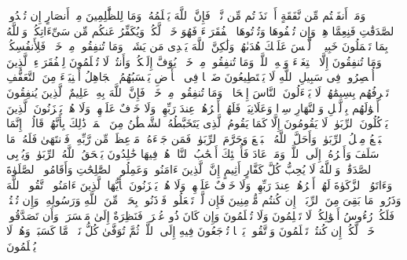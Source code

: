 \stopbuffer%
\startbuffer[\q:2:270]
وَمَاۤ أَنفَقۡتُم مِّن نَّفَقَةٍ أَوۡ نَذَرۡتُم مِّن نَّذۡرࣲ فَإِنَّ ٱللَّهَ یَعۡلَمُهُۥۗ وَمَا لِلظَّٰلِمِینَ مِنۡ أَنصَارٍ%
\stopbuffer%
\startbuffer[\q:2:271]
إِن تُبۡدُوا۟ ٱلصَّدَقَٰتِ فَنِعِمَّا هِیَۖ وَإِن تُخۡفُوهَا وَتُؤۡتُوهَا ٱلۡفُقَرَاۤءَ فَهُوَ خَیۡرࣱ لَّكُمۡۚ وَیُكَفِّرُ عَنكُم مِّن سَیِّءَاتِكُمۡۗ وَٱللَّهُ بِمَا تَعۡمَلُونَ خَبِیرࣱ%
\stopbuffer%
\startbuffer[\q:2:272]
۞ لَّیۡسَ عَلَیۡكَ هُدَىٰهُمۡ وَلَٰكِنَّ ٱللَّهَ یَهۡدِی مَن یَشَاۤءُۗ وَمَا تُنفِقُوا۟ مِنۡ خَیۡرࣲ فَلِأَنفُسِكُمۡۚ وَمَا تُنفِقُونَ إِلَّا ٱبۡتِغَاۤءَ وَجۡهِ ٱللَّهِۚ وَمَا تُنفِقُوا۟ مِنۡ خَیۡرࣲ یُوَفَّ إِلَیۡكُمۡ وَأَنتُمۡ لَا تُظۡلَمُونَ%
\stopbuffer%
\startbuffer[\q:2:273]
لِلۡفُقَرَاۤءِ ٱلَّذِینَ أُحۡصِرُوا۟ فِی سَبِیلِ ٱللَّهِ لَا یَسۡتَطِیعُونَ ضَرۡبࣰا فِی ٱلۡأَرۡضِ یَحۡسَبُهُمُ ٱلۡجَاهِلُ أَغۡنِیَاۤءَ مِنَ ٱلتَّعَفُّفِ تَعۡرِفُهُم بِسِیمَٰهُمۡ لَا یَسۡءَلُونَ ٱلنَّاسَ إِلۡحَافࣰاۗ وَمَا تُنفِقُوا۟ مِنۡ خَیۡرࣲ فَإِنَّ ٱللَّهَ بِهِۦ عَلِیمٌ%
\stopbuffer%
\startbuffer[\q:2:274]
ٱلَّذِینَ یُنفِقُونَ أَمۡوَٰلَهُم بِٱلَّیۡلِ وَٱلنَّهَارِ سِرࣰّا وَعَلَانِیَةࣰ فَلَهُمۡ أَجۡرُهُمۡ عِندَ رَبِّهِمۡ وَلَا خَوۡفٌ عَلَیۡهِمۡ وَلَا هُمۡ یَحۡزَنُونَ%
\stopbuffer%
\startbuffer[\q:2:275]
ٱلَّذِینَ یَأۡكُلُونَ ٱلرِّبَوٰا۟ لَا یَقُومُونَ إِلَّا كَمَا یَقُومُ ٱلَّذِی یَتَخَبَّطُهُ ٱلشَّیۡطَٰنُ مِنَ ٱلۡمَسِّۚ ذَٰلِكَ بِأَنَّهُمۡ قَالُوۤا۟ إِنَّمَا ٱلۡبَیۡعُ مِثۡلُ ٱلرِّبَوٰا۟ۗ وَأَحَلَّ ٱللَّهُ ٱلۡبَیۡعَ وَحَرَّمَ ٱلرِّبَوٰا۟ۚ فَمَن جَاۤءَهُۥ مَوۡعِظَةࣱ مِّن رَّبِّهِۦ فَٱنتَهَىٰ فَلَهُۥ مَا سَلَفَ وَأَمۡرُهُۥۤ إِلَى ٱللَّهِۖ وَمَنۡ عَادَ فَأُو۟لَٰۤئِكَ أَصۡحَٰبُ ٱلنَّارِۖ هُمۡ فِیهَا خَٰلِدُونَ%
\stopbuffer%
\startbuffer[\q:2:276]
یَمۡحَقُ ٱللَّهُ ٱلرِّبَوٰا۟ وَیُرۡبِی ٱلصَّدَقَٰتِۗ وَٱللَّهُ لَا یُحِبُّ كُلَّ كَفَّارٍ أَثِیمٍ%
\stopbuffer%
\startbuffer[\q:2:277]
إِنَّ ٱلَّذِینَ ءَامَنُوا۟ وَعَمِلُوا۟ ٱلصَّٰلِحَٰتِ وَأَقَامُوا۟ ٱلصَّلَوٰةَ وَءَاتَوُا۟ ٱلزَّكَوٰةَ لَهُمۡ أَجۡرُهُمۡ عِندَ رَبِّهِمۡ وَلَا خَوۡفٌ عَلَیۡهِمۡ وَلَا هُمۡ یَحۡزَنُونَ%
\stopbuffer%
\startbuffer[\q:2:278]
یَٰۤأَیُّهَا ٱلَّذِینَ ءَامَنُوا۟ ٱتَّقُوا۟ ٱللَّهَ وَذَرُوا۟ مَا بَقِیَ مِنَ ٱلرِّبَوٰۤا۟ إِن كُنتُم مُّؤۡمِنِینَ%
\stopbuffer%
\startbuffer[\q:2:279]
فَإِن لَّمۡ تَفۡعَلُوا۟ فَأۡذَنُوا۟ بِحَرۡبࣲ مِّنَ ٱللَّهِ وَرَسُولِهِۦۖ وَإِن تُبۡتُمۡ فَلَكُمۡ رُءُوسُ أَمۡوَٰلِكُمۡ لَا تَظۡلِمُونَ وَلَا تُظۡلَمُونَ%
\stopbuffer%
\startbuffer[\q:2:280]
وَإِن كَانَ ذُو عُسۡرَةࣲ فَنَظِرَةٌ إِلَىٰ مَیۡسَرَةࣲۚ وَأَن تَصَدَّقُوا۟ خَیۡرࣱ لَّكُمۡ إِن كُنتُمۡ تَعۡلَمُونَ%
\stopbuffer%
\startbuffer[\q:2:281]
وَٱتَّقُوا۟ یَوۡمࣰا تُرۡجَعُونَ فِیهِ إِلَى ٱللَّهِۖ ثُمَّ تُوَفَّىٰ كُلُّ نَفۡسࣲ مَّا كَسَبَتۡ وَهُمۡ لَا یُظۡلَمُونَ%
